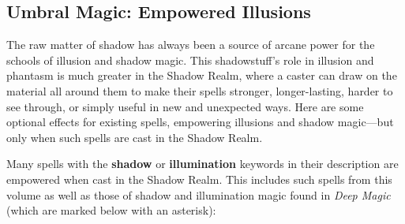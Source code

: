 \documentclass[10pt,a4paper,twoside,bg=print,twocolumn,openany,nodeprecatedcode]{dndbook}
\begin{document}
\subsection{Umbral Magic: Empowered Illusions}
The raw matter of shadow has always been a source of arcane power for the schools of illusion and shadow magic. This shadowstuff's role in illusion and phantasm is much greater in the Shadow Realm, where a caster can draw on the material all around them to make their spells stronger, longer-lasting, harder to see through, or simply useful in new and unexpected ways. Here are some optional effects for existing spells, empowering illusions and shadow magic—but only when such spells are cast in the Shadow Realm.

Many spells with the \textbf{shadow} or \textbf{illumination} keywords in their description are empowered when cast in the Shadow Realm. This includes such spells from this volume as well as those of shadow and illumination magic found in \textit{Deep Magic} (which are marked below with an asterisk):
\end{document}
